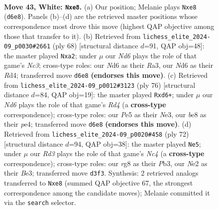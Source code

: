\documentclass[11pt]{article}
\begin{document}
\clearpage

\begin{figure}[p]\centering
\begin{subfigure}{0.46\textwidth}\centering
\resizebox{\linewidth}{!}{%
\newchessgame
\chessboard[
  setfen={r2bb1r1/1p5p/nk1N2pP/p3Pp2/P2p4/3R2P1/1B2N2K/R7 w - - 10 43},
  showmover=false,
  pgfstyle=straightmove, color=movearrow, markmove={d6-e8}
]}
\caption{}
\end{subfigure}\hfill
\begin{subfigure}{0.46\textwidth}\centering
\resizebox{\linewidth}{!}{%
\newchessgame
\chessboard[
  setfen={1r4k1/5pp1/3p3p/4n1b1/3RP1P1/R1N4P/p7/1b3B1K w - - 4 35},
  showmover=false,
  pgfstyle=straightmove, color=movearrow, markmove={c3-a2}
]}
\caption{}
\end{subfigure}
\\[4pt]
\begin{subfigure}{0.46\textwidth}\centering
\resizebox{\linewidth}{!}{%
\newchessgame
\chessboard[
  setfen={8/p4b2/1prr2kp/5p2/3RpPp1/P3N1P1/1P4P1/1K5R w - - 0 39},
  showmover=false,
  pgfstyle=straightmove, color=movearrow, markmove={d4-d6}
]}
\caption{}
\end{subfigure}\hfill
\begin{subfigure}{0.46\textwidth}\centering
\resizebox{\linewidth}{!}{%
\newchessgame
\chessboard[
  setfen={4rk2/2pRbp2/np4p1/p5P1/P1N1P3/1P2BP2/6K1/8 w - - 2 37},
  showmover=false,
  pgfstyle=straightmove, color=movearrow, markmove={c4-e5}
]}
\caption{}
\end{subfigure}
\caption{\textbf{Move 43, White: \texttt{Nxe8}.} (a) Our position; Melanie plays \texttt{Nxe8} (\texttt{d6e8}). Panels (b)--(d) are the retrieved master positions whose correspondence most drove this move (highest QAP objective among those that transfer to it). (b) Retrieved from \texttt{lichess\_elite\_2024-09\_p0030\#2661} (ply 68) [structural distance $d$=91, QAP obj=48]: the master played \texttt{Nxa2}; under $\mu$ our \emph{Nd6} plays the role of that game's \emph{Nc3}; cross-type roles: our \emph{N}d6 as their \emph{R}a3, our \emph{N}d6 as their \emph{R}d4; transferred move \texttt{d6e8} \textbf{(endorses this move)}. (c) Retrieved from \texttt{lichess\_elite\_2024-09\_p0012\#3123} (ply 76) [structural distance $d$=84, QAP obj=19]: the master played \texttt{Rxd6+}; under $\mu$ our \emph{Nd6} plays the role of that game's \emph{Rd4} (a \textbf{cross-type} correspondence); cross-type roles: our \emph{P}e5 as their \emph{N}e3, our \emph{b}e8 as their \emph{p}e4; transferred move \texttt{d6e8} \textbf{(endorses this move)}. (d) Retrieved from \texttt{lichess\_elite\_2024-09\_p0020\#458} (ply 72) [structural distance $d$=94, QAP obj=38]: the master played \texttt{Ne5}; under $\mu$ our \emph{Rd3} plays the role of that game's \emph{Nc4} (a \textbf{cross-type} correspondence); cross-type roles: our \emph{r}g8 as their \emph{P}b3, our \emph{N}e2 as their \emph{B}e3; transferred move \texttt{d3f3}. Synthesis: 2 retrieved analogs transferred to \texttt{Nxe8} (summed QAP objective 67, the strongest correspondence among the candidate moves); Melanie committed it via the \texttt{search} selector.}
\label{fig:thought-m84}
\end{figure}
\end{document}
